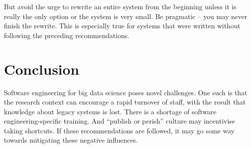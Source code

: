 \documentclass{bmcart}
\begin{document}
But avoid the urge to rewrite an entire system from the beginning unless it is really the only option or the system is very small. Be pragmatic \cite{pragprog} -- you may never finish the rewrite. This is especially true for systems that were written without following the preceding recommendations. 

\section*{Conclusion}

Software engineering for big data science poses novel challenges. One such is that the research context can encourage a rapid turnover of staff, with the result that knowledge about legacy systems is lost. There is a shortage of software engineering-specific training. And ``publish or perish'' culture may incentivise taking shortcuts. If these recommendations are followed, it may go some way towards mitigating these negative influences. 


\end{document}
